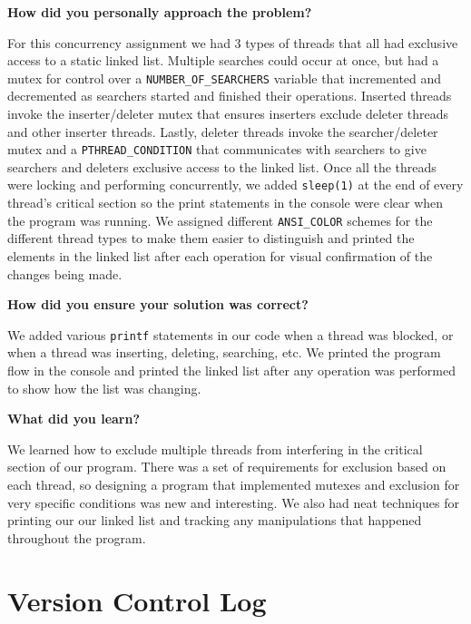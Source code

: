 \documentclass[10pt,letterpaper,draftclsnofoot,onecolumn]{IEEEtran}
\begin{document}
\bigskip

\noindent\textbf{How did you personally approach the problem?}
\medskip

\medskip

\noindent For this concurrency assignment we had 3 types of threads that all had exclusive access to a static linked list. Multiple searches could occur at once, but had a mutex for control over a \texttt{NUMBER\_OF\_SEARCHERS} variable that incremented and decremented as searchers started and finished their operations. Inserted threads invoke the inserter/deleter mutex that ensures inserters exclude deleter threads and other inserter threads. Lastly, deleter threads invoke the searcher/deleter mutex and a \texttt{PTHREAD\_CONDITION} that communicates with searchers to give searchers and deleters exclusive access to the linked list. Once all the threads were locking and performing concurrently, we added \texttt{sleep(1)} at the end of every thread's critical section so the print statements in the console were clear when the program was running. We assigned different \texttt{ANSI\_COLOR} schemes for the different thread types to make them easier to distinguish and printed the elements in the linked list after each operation for visual confirmation of the changes being made.

\bigskip

\noindent\textbf{How did you ensure your solution was correct?}
\medskip

\medskip

\noindent We added various \texttt{printf} statements in our code when a thread was blocked, or when a thread was inserting, deleting, searching, etc. We printed the program flow in the console and printed the linked list after any operation was performed to show how the list was changing.
\bigskip

\noindent\textbf{What did you learn?}
\medskip

\medskip

\noindent We learned how to exclude multiple threads from interfering in the critical section of our program. There was a set of requirements for exclusion based on each thread, so designing a program that implemented mutexes and exclusion for very specific conditions was new and interesting. We also had neat techniques for printing our our linked list and tracking any manipulations that happened throughout the program.
\medskip


\section{Version Control Log}
\bigskip
\end{document}
